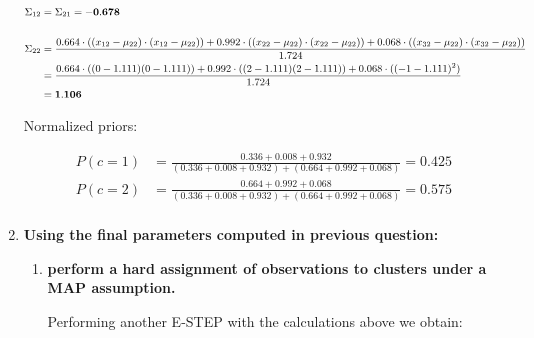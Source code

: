 \documentclass[12pt]{article}
\begin{document}
\begin{enumerate}
    \begin{equation*}
        \fontsize{9pt}{10pt}\selectfont
        \begin{aligned}
            \Sigma_{12} &= \Sigma_{21} = \mathbf{-0.678}\\
            \\
            \Sigma_{22} &= \frac{0.664 \cdot ((x_{12}-\mu_{22}) \cdot (x_{12} - \mu_{22}))+ 0.992 \cdot ((x_{22}-\mu_{22}) \cdot (x_{22} - \mu_{22}))+ 0.068 \cdot ((x_{32}-\mu_{22}) \cdot (x_{32} - \mu_{22}))}{1.724}\\
            &=\frac{0.664 \cdot ((0-1.111)(0-1.111)) + 0.992 \cdot ((2-1.111)(2-1.111)) + 0.068 \cdot ((-1-1.111)^2)}{1.724}\\
            &= \mathbf{1.106}\\
        \end{aligned}
    \end{equation*}

    \newpage
    Normalized priors:

    \begin{equation*}
        \begin{aligned}
            P(c=1) &= \frac{0.336+0.008+0.932}{(0.336+0.008+0.932) + (0.664+0.992+0.068)} = 0.425\\
            P(c=2) &= \frac{0.664+0.992+0.068}{(0.336+0.008+0.932) + (0.664+0.992+0.068)} = 0.575\\
        \end{aligned}
    \end{equation*}

    \vspace{10pt}
    \item \textbf{Using the ﬁnal parameters computed in previous question:}
    \begin{enumerate}[label=\alph*)]
        \item \textbf{perform a hard assignment of observations to clusters under a MAP assumption.}
        
        \vspace{10pt}
        Performing another E-STEP with the calculations above we obtain:

        \vspace{10pt}


\end{enumerate}
\end{enumerate}
\end{document}
